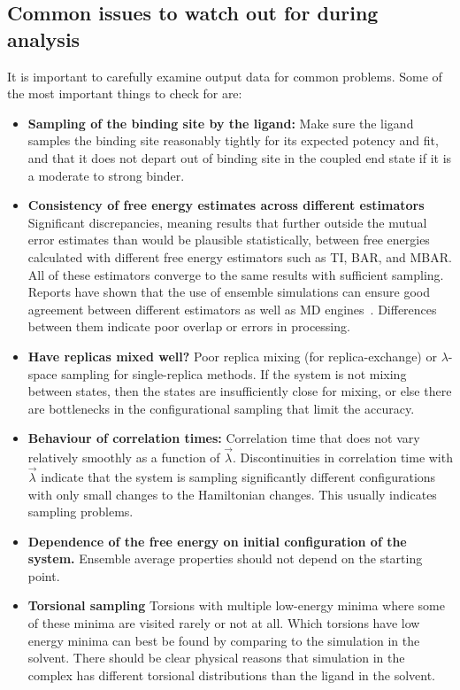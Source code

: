\documentclass[9pt,bestpractices]{livecoms}
\begin{document}
\subsection{Common issues to watch out for during analysis}

It is important to carefully examine output data for common problems. Some of the most important things to check for are:
\begin{itemize}
\item \textbf{Sampling of the binding site by the ligand:} Make sure the ligand samples the binding site reasonably tightly for its expected potency and fit, and that it does not depart out of binding site in the coupled end state if it is a moderate to strong binder. 
\item \textbf{Consistency of free energy estimates across different estimators} Significant discrepancies, meaning results that further outside the mutual error estimates than would be plausible statistically, between free energies calculated with different free energy estimators such as TI, BAR, and MBAR. All of these estimators converge to the same results with sufficient sampling. Reports have shown that the use of ensemble simulations can ensure good agreement between different estimators as well as MD engines~\cite{wade2022}. Differences between them indicate poor overlap or errors in processing.
\item \textbf{Have replicas mixed well?} Poor replica mixing (for replica-exchange) or $\lambda$-space sampling for single-replica methods. If the system is not mixing between states, then the states are insufficiently close for mixing, or else there are bottlenecks in the configurational sampling that limit the accuracy.
\item \textbf{Behaviour of correlation times:} Correlation time that does not vary relatively smoothly as a function of $\vec{\lambda}$. Discontinuities in correlation time with $\vec{\lambda}$ indicate that the system is sampling significantly different configurations with only small changes to the Hamiltonian changes. This usually indicates sampling problems.
\item \textbf{Dependence of the free energy on initial configuration of the system.} Ensemble average properties should not depend on the starting point.
\item \textbf{Torsional sampling} Torsions with multiple low-energy minima where some of these minima are visited rarely or not at all. Which torsions have low energy minima can best be found by comparing to the simulation in the solvent. There should be clear physical reasons that simulation in the complex has different torsional distributions than the ligand in the solvent. 

\end{itemize}
\end{document}
